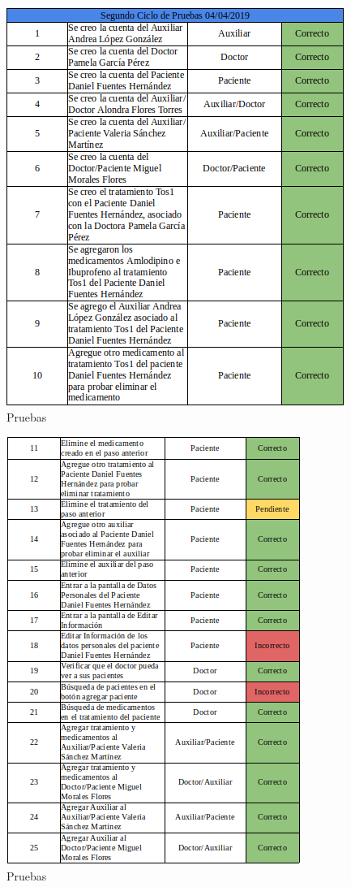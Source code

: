 \begin{figure}[!htbp]			
	\hypertarget{fig:Pruebas2}{\hspace{1pt}}
	\begin{center}
		\includegraphics[height=0.4\textheight]{Pruebas/images/psc1}
		\caption{Pruebas}
		\label{fig:Pruebas2}
	\end{center}
\end{figure}
\newpage
\begin{figure}[!htbp]			
	\hypertarget{fig:Pruebas2}{\hspace{1pt}}
	\begin{center}
		\includegraphics[height=0.4\textheight]{Pruebas/images/psc2}
		\caption{Pruebas}
		\label{fig:Pruebas2}
	\end{center}
\end{figure}


